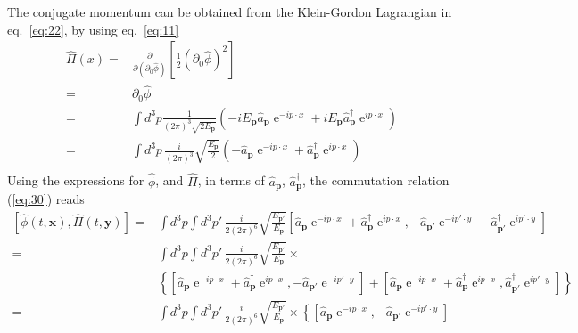 \begin{frame}
The conjugate momentum can be obtained from the Klein-Gordon Lagrangian in eq.~\eqref{eq:22}, 
by using eq.~\eqref{eq:11}
\begin{align}
  \widehat{\Pi}(x)=&\frac{\partial}{\partial(\partial_0\widehat{\phi})}\left[\tfrac{1}{2}(\partial_0\widehat{\phi})^2\right]\nonumber\\
  =&\partial_0\widehat{\phi}\nonumber\\
  =&\int d^3p \frac{1}{(2\pi)^3\sqrt{2E_{\mathbf{p}} }}
  \left(-i E_{\mathbf{p}}\widehat{a}_{\mathbf{p}} \operatorname{e}^{-i p\cdot x }+iE_{\mathbf{p}}\widehat{a}_{\mathbf{p}}^\dagger \operatorname{e}^{i p\cdot x }\right)\nonumber\\
  =&\int d^3p\,\frac{i}{(2\pi)^3}\sqrt{\frac{E_\mathbf{p}}{2}}
  \left(-\widehat{a}_{\mathbf{p}} \operatorname{e}^{-i p\cdot x }+\widehat{a}_{\mathbf{p}}^\dagger \operatorname{e}^{i p\cdot x }\right)\nonumber\\
\end{align}
Using the expressions for $\widehat{\phi}$, and $\widehat{\Pi}$, in terms of $\widehat{a}_\mathbf{p}$, $\widehat{a}_\mathbf{p}^\dagger$, the commutation relation (\ref{eq:30}) reads 
\begin{align}
\left[\widehat{\phi}(t,\mathbf{x}),\widehat{\Pi}(t,\mathbf{y})\right]=&
\int d^3p\int d^3p'\,\frac{i}{2(2\pi)^6}\sqrt{\frac{E_{\mathbf{p}'}}{E_{\mathbf{p}}}}
\left[\widehat{a}_\mathbf{p} \operatorname{e}^{-i p\cdot x }+\widehat{a}_\mathbf{p}^\dagger \operatorname{e}^{i p\cdot x },
-\widehat{a}_{\mathbf{p}'} \operatorname{e}^{-i p'\cdot y }+\widehat{a}_{\mathbf{p}'}^\dagger \operatorname{e}^{i p'\cdot y }\right]\nonumber\\
=&
\int d^3p\int d^3p'\,\frac{i}{2(2\pi)^6}\sqrt{\frac{E_{\mathbf{p}'}}{E_{\mathbf{p}}}}\times\nonumber\\
&\left\{ \left[\widehat{a}_\mathbf{p} \operatorname{e}^{-i p\cdot x }+\widehat{a}_\mathbf{p}^\dagger \operatorname{e}^{i p\cdot x },-\widehat{a}_{\mathbf{p}'} \operatorname{e}^{-i p'\cdot y }\right]
+\left[\widehat{a}_\mathbf{p} \operatorname{e}^{-i p\cdot x }+\widehat{a}_\mathbf{p}^\dagger \operatorname{e}^{i p\cdot x },\widehat{a}_{\mathbf{p}'}^\dagger \operatorname{e}^{i p'\cdot y }\right]\right\}\nonumber\\
=&
\int d^3p\int d^3p'\,\frac{i}{2(2\pi)^6}\sqrt{\frac{E_{\mathbf{p}'}}{E_{\mathbf{p}}}}\times\left\{ 
\left[\widehat{a}_\mathbf{p} \operatorname{e}^{-i p\cdot x },-\widehat{a}_{\mathbf{p}'} \operatorname{e}^{-i p'\cdot y }\right]\right.\nonumber\\

\end{align}
\end{frame}
